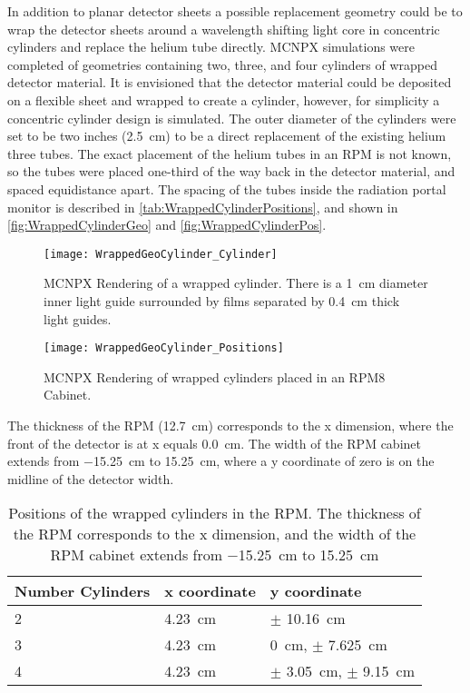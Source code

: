In addition to planar detector sheets a possible replacement geometry could be to wrap the detector sheets around a wavelength shifting light core in concentric cylinders and replace the helium tube directly.
MCNPX simulations were completed of geometries containing two, three, and four cylinders of wrapped detector material.
It is envisioned that the detector material could be deposited on a flexible sheet and wrapped to create a cylinder, however, for simplicity a concentric cylinder design is simulated.
The outer diameter of the cylinders were set to be two inches (\SI{2.5}{\cm}) to be a direct replacement of the existing helium three tubes.
The exact placement of the helium tubes in an RPM is not known, so the tubes were placed one-third of the way back in the detector material, and spaced equidistance apart.
The spacing of the tubes inside the radiation portal monitor is described in \autoref{tab:WrappedCylinderPositions}, and shown in \autoref{fig:WrappedCylinderGeo} and \autoref{fig:WrappedCylinderPos}.
\begin{figure}
  \centering
  \texttt{[image: WrappedGeoCylinder\_Cylinder]}
  \caption[Rendering of Wrapped Cylinder Geometry]{MCNPX Rendering of a wrapped cylinder.  There is a \SI{1}{\cm} diameter inner light guide surrounded by films separated by \SI{0.4}{\cm} thick light guides.}
  \label{fig:WrappedCylinderGeo}
\end{figure}
\begin{figure}
  \centering
  \texttt{[image: WrappedGeoCylinder\_Positions]}
  \caption[Positions of Wrapped Cylinders in RPM Cabinet]{MCNPX Rendering of wrapped cylinders placed in an RPM8 Cabinet.}
  \label{fig:WrappedCylinderPos}
\end{figure}
The thickness of the RPM (\SI{12.7}{\cm}) corresponds to the x dimension, where the front of the detector is at x equals \SI{0.0}{\cm}.
The width of the RPM cabinet extends from \SI{-15.25}{\cm} to \SI{15.25}{\cm}, where a y coordinate of zero is on the midline of the detector width.
\begin{table}
  \caption[Wrapped Cylinder Positions]{Positions of the wrapped cylinders in the RPM. The thickness of the RPM corresponds to the x dimension, and the width of the RPM cabinet extends from \SI{-15.25}{\cm} to \SI{15.25}{\cm}}
  \label{tab:WrappedCylinderPositions}
  \begin{tabular}{m{2cm} | m{3cm} m{4cm} }
    \toprule
    Number Cylinders & x coordinate & y coordinate \\
    \midrule
    2 & \SI{4.23}{\cm} & $\pm$ \SI{10.16}{\cm} \\
    3 & \SI{4.23}{\cm} & \SI{0}{\cm}, $\pm$ \SI{7.625}{\cm} \\
    4 & \SI{4.23}{\cm} & $\pm$ \SI{3.05}{\cm}, $\pm$ \SI{9.15}{\cm} \\
    \bottomrule
  \end{tabular}
\end{table}

